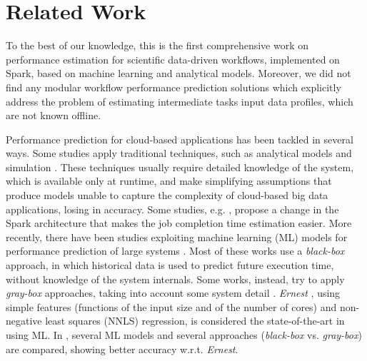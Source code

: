 \documentclass[a4paper, 10pt, conference]{ieeeconf}      %
\begin{document}
\section{Related Work}
\label{section:related_work}
To the best of our knowledge, this is the first comprehensive work on performance estimation for scientific data-driven workflows, implemented on Spark, based on machine learning and analytical models. 
Moreover, we did not find any modular workflow performance prediction solutions which explicitly address the problem of estimating intermediate tasks input data profiles, which are not known offline.

Performance prediction for cloud-based applications has been tackled in several ways. 
Some studies apply traditional techniques, such as analytical models \cite{nelson1988approximate, mak, ardagna1, liang2000performance} and simulation \cite{bertoli2009jmt}. These techniques usually require detailed knowledge of the system, which is available only at runtime, and make  simplifying assumptions that  produce models unable to capture the complexity of cloud-based big data applications, losing in accuracy. Some studies, e.g. \cite{monotasks}, propose a change in the Spark architecture that makes the job completion time estimation easier. More recently, there have been studies exploiting machine learning (ML) models for performance prediction of large systems \cite{ernest, MUSTAFA20183767, pan2017hemingway, alipourfard2017cherrypick, ARDAGNA2019}.
Most of these works use a \textit{black-box} approach, in which historical data is used to predict future execution time, without knowledge of the system internals. Some works, instead, try to apply \textit{gray-box} approaches, taking into account some system detail \cite{ARDAGNA2019, shon2008scientific}. 
\textit{Ernest} \cite{ernest}, using simple features (functions of the input size and of the number of cores) and non-negative least squares (NNLS) regression, is considered the state-of-the-art in using ML. In \cite{ARDAGNA2019}, several ML models and several approaches (\textit{black-box} vs. \textit{gray-box}) are compared, showing better accuracy w.r.t. \textit{Ernest}.
\end{document}
